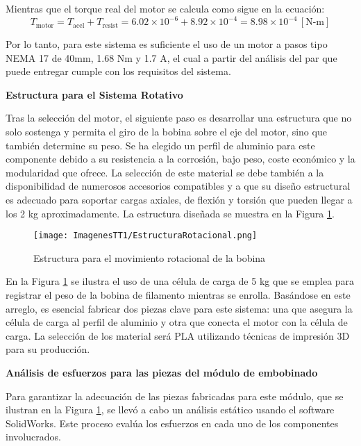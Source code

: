 \documentclass[14pt,oneside]{extarticle} %
\begin{document}
Mientras que el torque real del motor se calcula como sigue en la ecuación:
\begin{equation}
T_{\text{motor}} = T_{\text{acel}} + T_{\text{resist}} = 6.02 \times 10^{-6} + 8.92 \times 10^{-4} = 8.98 \times 10^{-4} \, [\text{N-m}]
\label{eq:torque_motor}
\end{equation}

Por lo tanto, para este sistema es suficiente el uso de un motor a pasos tipo NEMA 17 de 40mm, 1.68 Nm y 1.7 A, el cual a partir del análisis del par que puede entregar cumple con los requisitos del sistema.

\textbf{Estructura para el Sistema Rotativo}

Tras la selección del motor, el siguiente paso es desarrollar una estructura que no solo sostenga y permita el giro de la bobina sobre el eje del motor, sino que también determine su peso. Se ha elegido un perfil de aluminio para este componente debido a su resistencia a la corrosión, bajo peso, coste económico y la modularidad que ofrece. La selección de este material se debe también a la disponibilidad de numerosos accesorios compatibles y a que su diseño estructural es adecuado para soportar cargas axiales, de flexión y torsión que pueden llegar a los 2 kg aproximadamente. La estructura diseñada se muestra en la Figura \ref{fig:EstructuraRotacional}.

\begin{figure}[H]
    \centering
    \texttt{[image: ImagenesTT1/EstructuraRotacional.png]}
    \caption{Estructura para el movimiento rotacional de la bobina}
    \label{fig:EstructuraRotacional}
\end{figure}

\vspace{-0.5 cm}

En la Figura \ref{fig:EstructuraRotacional} se ilustra el uso de una célula de carga de 5 kg que se emplea para registrar el peso de la bobina de filamento mientras se enrolla. Basándose en este arreglo, es esencial fabricar dos piezas clave para este sistema: una que asegura la célula de carga al perfil de aluminio y otra que conecta el motor con la célula de carga. La selección de los material será PLA utilizando técnicas de impresión 3D para su producción.

\textbf{Análisis de esfuerzos para las piezas del módulo de embobinado}

Para garantizar la adecuación de las piezas fabricadas para este módulo, que se ilustran en la Figura \ref{fig:EstructuraRotacional}, se llevó a cabo un análisis estático usando el software SolidWorks\textregistered. Este proceso evalúa los esfuerzos en cada uno de los componentes involucrados. 
\end{document}
